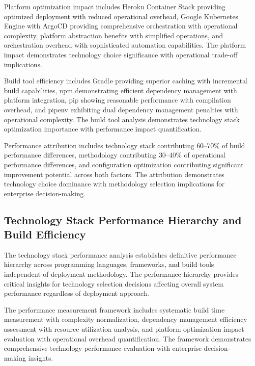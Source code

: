 Platform optimization impact includes Heroku Container Stack providing optimized deployment with reduced operational overhead, Google Kubernetes Engine with ArgoCD providing comprehensive orchestration with operational complexity, platform abstraction benefits with simplified operations, and orchestration overhead with sophisticated automation capabilities. The platform impact demonstrates technology choice significance with operational trade-off implications.

Build tool efficiency includes Gradle providing superior caching with incremental build capabilities, npm demonstrating efficient dependency management with platform integration, pip showing reasonable performance with compilation overhead, and pipenv exhibiting dual dependency management penalties with operational complexity. The build tool analysis demonstrates technology stack optimization importance with performance impact quantification.

Performance attribution includes technology stack contributing 60--70\% of build performance differences, methodology contributing 30--40\% of operational performance differences, and configuration optimization contributing significant improvement potential across both factors. The attribution demonstrates technology choice dominance with methodology selection implications for enterprise decision-making.


\subsection{Technology Stack Performance Hierarchy and Build Efficiency}
\label{subsec:technology_performance}

The technology stack performance analysis establishes definitive performance hierarchy across programming languages, frameworks, and build tools independent of deployment methodology. The performance hierarchy provides critical insights for technology selection decisions affecting overall system performance regardless of deployment approach.

The performance measurement framework includes systematic build time measurement with complexity normalization, dependency management efficiency assessment with resource utilization analysis, and platform optimization impact evaluation with operational overhead quantification. The framework demonstrates comprehensive technology performance evaluation with enterprise decision-making insights.


